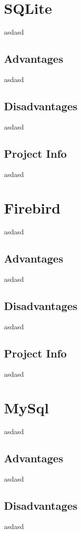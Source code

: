 		\section{SQLite}
		asdasd

		
			\subsection{Advantages}
asdasd
			
			\subsection{Disadvantages}
asdasd
			
			\subsection{Project Info}
asdasd
		
		\section{Firebird}
		asdasd

		
			\subsection{Advantages}
asdasd
			
			\subsection{Disadvantages}
asdasd
			
			\subsection{Project Info}
asdasd
				
		\section{MySql}
		asdasd

		
			\subsection{Advantages}
asdasd
			
			\subsection{Disadvantages}
asdasd
			
